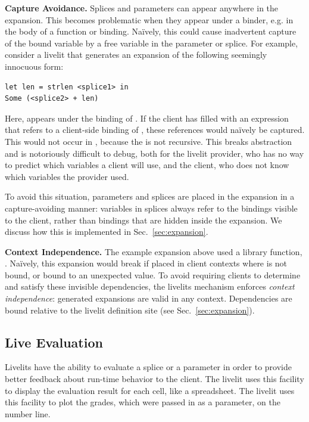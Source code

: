 \textbf{Capture Avoidance.}
Splices and parameters can appear anywhere in the expansion. 
This becomes problematic when
they appear under a binder, e.g. in the body of a function or  binding.
Na\"ively, this could cause inadvertent capture of the bound variable by a free variable
in the parameter or splice. For example, consider a livelit that generates an expansion
of the following seemingly innocuous form:
\begin{lstlisting}[numbers=none]
let len = strlen <splice1> in
Some (<splice2> + len)
\end{lstlisting}
Here,  appears under the binding of . If the client has filled
 with an expression that refers to a client-side binding of ,
these references would na\"ively be captured. This would not occur in , 
because the  is not recursive.
This breaks abstraction and is notoriously difficult to debug,
both for the livelit provider, who has no way to predict which variables a client will use,
 and the client, who does not know which variables the provider used.

To avoid this situation, parameters and splices are placed in the expansion
in a capture-avoiding manner: variables in splices
always refer to the bindings visible to the client, 
rather than bindings that are hidden inside the expansion.
We discuss how this is implemented in Sec.~\ref{sec:expansion}.

\textbf{Context Independence.}
The example expansion above used a library function, .
Na\"ively, this expansion would break if placed 
in client contexts where  is not bound, or bound to 
an unexpected value.
To avoid requiring clients to determine and satisfy these invisible 
dependencies, the livelits mechanism enforces \emph{context independence}:
generated expansions are valid in any context. Dependencies are bound 
relative to the livelit definition site (see Sec.~\ref{sec:expansion}).

\subsection{Live Evaluation}\label{sec:live-evaluation}
Livelits have the ability to evaluate a splice or a parameter 
in order to provide better feedback about run-time behavior to the client.
The  livelit uses this facility to display
the evaluation result for each cell, like a spreadsheet.
The  livelit uses this facility to plot the grades, which were 
passed in as a parameter, on the number line.

